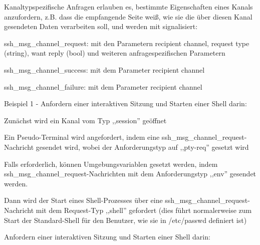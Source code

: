 \documentclass[a4paper]{article}
\begin{document}
\begin{multicols}{3}
\begin{itemize*}
\begin{itemize*}
            \end{itemize*}
            \item Kanaltypspezifische Anfragen erlauben es, bestimmte Eigenschaften eines Kanals anzufordern, z.B. dass die empfangende Seite weiß, wie sie die über diesen Kanal gesendeten Daten verarbeiten soll, und werden mit signalisiert:
            \begin{itemize*}
                  \item ssh\_msg\_channel\_request: mit den Parametern recipient channel, request type (string), want reply (bool) und weiteren anfragespezifischen Parametern
                  \item ssh\_msg\_channel\_success: mit dem Parameter recipient channel
                  \item ssh\_msg\_channel\_failure: mit dem Parameter recipient channel
            \end{itemize*}
            \item Beispiel 1 - Anfordern einer interaktiven Sitzung und Starten einer Shell darin:
            \begin{itemize*}
                  \item Zunächst wird ein Kanal vom Typ ,,session'' geöffnet
                  \item Ein Pseudo-Terminal wird angefordert, indem eine ssh\_msg\_channel\_request-Nachricht gesendet wird, wobei der Anforderungstyp auf ,,pty-req'' gesetzt wird
                  \item Falls erforderlich, können Umgebungsvariablen gesetzt werden, indem ssh\_msg\_channel\_request-Nachrichten mit dem Anforderungstyp ,,env'' gesendet werden.
                  \item Dann wird der Start eines Shell-Prozesses über eine ssh\_msg\_channel\_request-Nachricht mit dem Request-Typ ,,shell'' gefordert (dies führt normalerweise zum Start der Standard-Shell für den Benutzer, wie sie in /etc/passwd definiert ist)
                  \item Anfordern einer interaktiven Sitzung und Starten einer Shell darin:

            \end{itemize*}
      \end{itemize*}


\end{multicols}
\end{document}
